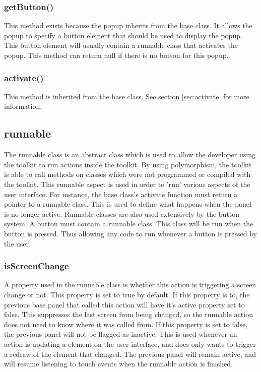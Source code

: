 \subsubsection{getButton()}

This method exists because the popup inherits from the base class. It allows the popup to specify a button element that should be used to display the popup. This button element will usually contain a runnable class that activates the popup. This method can return null if there is no button for this popup.

\subsubsection{activate()}

This method is inherited from the base class. See section \ref{sec:activate} for more information.


\subsection{runnable}
\label{sec:runnable}

The runnable class is an abstract class which is used to allow the developer using the toolkit to run actions inside the toolkit. By using polymorphism, the toolkit is able to call methods on classes which were not programmed or compiled with the toolkit. This runnable aspect is used in order to 'run' various aspects of the user interface. For instance, the base class's activate function must return a pointer to a runnable class. This is used to define what happens when the panel is no longer active. Runnable classes are also used extensively by the button system. A button must contain a runnable class. This class will be run when the button is pressed. Thus allowing any code to run whenever a button is pressed by the user. 

\subsubsection{isScreenChange}

A property used in the runnable class is whether this action is triggering a screen change or not. This property is set to true by default. If this property is to, the previous base panel that called this action will have it's active property set to false. This suppresses the last screen from being changed, so the runnable action does not need to know where it was called from. If this property is set to false, the previous panel will not be flagged as inactive. This is used whenever an action is updating a element on the user interface, and does only wants to trigger a redraw of the element that changed. The previous panel will remain active, and will resume listening to touch events when the runnable action is finished.

